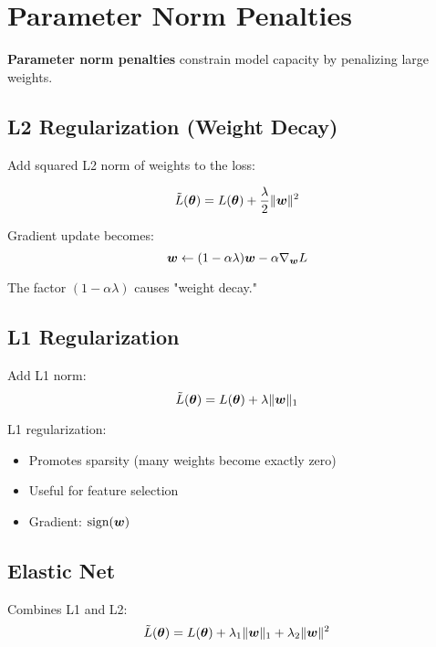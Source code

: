 
\section{Parameter Norm Penalties}
\label{sec:parameter-penalties}

\textbf{Parameter norm penalties} constrain model capacity by penalizing large weights.

\subsection{L2 Regularization (Weight Decay)}

Add squared L2 norm of weights to the loss:

\begin{equation}
\tilde{L}(\boldsymbol{\theta}) = L(\boldsymbol{\theta}) + \frac{\lambda}{2} \|\boldsymbol{w}\|^2
\end{equation}

Gradient update becomes:
\begin{equation}
\boldsymbol{w} \leftarrow (1 - \alpha\lambda)\boldsymbol{w} - \alpha \nabla_{\boldsymbol{w}} L
\end{equation}

The factor $(1 - \alpha\lambda)$ causes "weight decay."

\subsection{L1 Regularization}

Add L1 norm:
\begin{equation}
\tilde{L}(\boldsymbol{\theta}) = L(\boldsymbol{\theta}) + \lambda \|\boldsymbol{w}\|_1
\end{equation}

L1 regularization:
\begin{itemize}
    \item Promotes sparsity (many weights become exactly zero)
    \item Useful for feature selection
    \item Gradient: $\text{sign}(\boldsymbol{w})$
\end{itemize}

\subsection{Elastic Net}

Combines L1 and L2:
\begin{equation}
\tilde{L}(\boldsymbol{\theta}) = L(\boldsymbol{\theta}) + \lambda_1 \|\boldsymbol{w}\|_1 + \lambda_2 \|\boldsymbol{w}\|^2
\end{equation}

